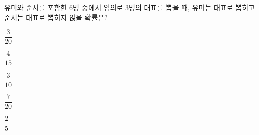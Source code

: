 유미와 준서를 포함한 $6$명 중에서 임의로 $3$명의 대표를 뽑을 때, 유미는 대표로 뽑히고 준서는 대표로 뽑히지 않을 확률은?
\begin{choices32}{\rule[-3ex]{0pt}{8ex}$\dfrac{3}{20}$}{\rule[-3ex]{0pt}{8ex}$\dfrac{4}{15}$}{\rule[-3ex]{0pt}{8ex}$\dfrac{3}{10}$}{\rule[-3ex]{0pt}{8ex}$\dfrac{7}{20}$}{\rule[-3ex]{0pt}{8ex}$\dfrac{2}{5}$}\end{choices32}
